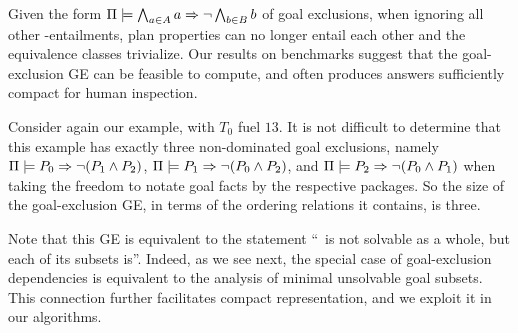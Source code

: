 Given the form $\Pi \models \bigwedge_{a \in A} a \Rightarrow \neg
  \bigwedge_{b \in B} b$ of goal exclusions, when ignoring all other
\plans-entailments, plan properties can no longer entail each other
and the equivalence classes trivialize.
%
%
%
%
%
%
Our results on benchmarks suggest that the goal-exclusion GE can be
feasible to compute, and often produces answers sufficiently compact
for human inspection.

Consider again our example, with $T_0$ fuel $13$. It is not difficult
to determine that this example has exactly three non-dominated goal
exclusions, namely $\Pi \models P_0 \Rightarrow \neg (P_1 \wedge P_2)$,
$\Pi \models P_1 \Rightarrow \neg (P_0 \wedge P_2)$, and
$\Pi \models P_2 \Rightarrow \neg (P_0 \wedge P_1)$ when taking the freedom
to notate goal facts by the respective packages.
%
%
So the size of the goal-exclusion GE, in terms of the ordering
relations it contains, is three. 

Note that this GE is equivalent to the statement ``\goalsoft\ is not
solvable as a whole, but each of its subsets is''. Indeed, as we see
next, the special case of goal-exclusion dependencies is equivalent to
the analysis of minimal unsolvable goal subsets.  This connection
further facilitates compact representation, and we exploit it in our
algorithms.
